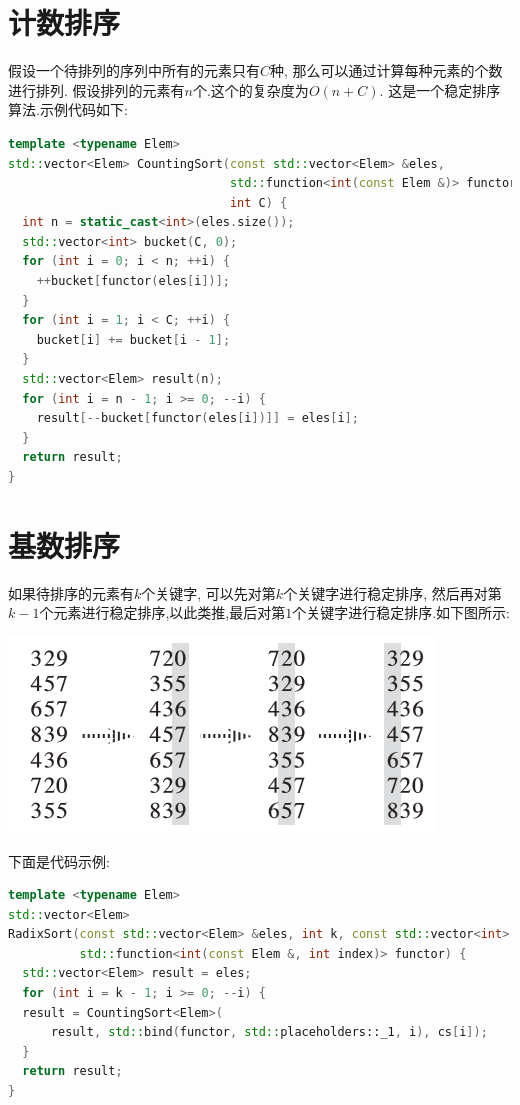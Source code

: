\documentclass{article}
\begin{document}
\section{计数排序}
假设一个待排列的序列中所有的元素只有$C$种, 那么可以通过计算每种元素的个数进行排列. 假设排列的元素有$n$个.这个的复杂度为$O(n+C)$. 这是一个稳定排序算法.示例代码如下: \par
\begin{lstlisting}[language=C++, caption={Counting Sort}]
template <typename Elem>
std::vector<Elem> CountingSort(const std::vector<Elem> &eles,
                               std::function<int(const Elem &)> functor,
                               int C) {
  int n = static_cast<int>(eles.size());
  std::vector<int> bucket(C, 0);
  for (int i = 0; i < n; ++i) {
    ++bucket[functor(eles[i])];
  }
  for (int i = 1; i < C; ++i) {
    bucket[i] += bucket[i - 1];
  }
  std::vector<Elem> result(n);
  for (int i = n - 1; i >= 0; --i) {
    result[--bucket[functor(eles[i])]] = eles[i];
  }
  return result;
}
\end{lstlisting}

\section{基数排序}
如果待排序的元素有$k$个关键字, 可以先对第$k$个关键字进行稳定排序, 然后再对第$k-1$个元素进行稳定排序,以此类推,最后对第$1$个关键字进行稳定排序.如下图所示: \par
\includegraphics[scale=0.65]{pic1.png} \par
下面是代码示例: \par
\begin{lstlisting}[language=C++, caption={Radix Sort}]
template <typename Elem>
std::vector<Elem>
RadixSort(const std::vector<Elem> &eles, int k, const std::vector<int> &cs,
          std::function<int(const Elem &, int index)> functor) {
  std::vector<Elem> result = eles;
  for (int i = k - 1; i >= 0; --i) {
  result = CountingSort<Elem>(
      result, std::bind(functor, std::placeholders::_1, i), cs[i]);
  }
  return result;
}

\end{lstlisting}
\end{document}
